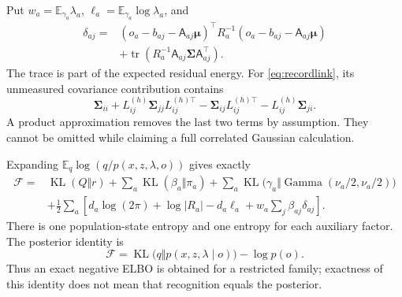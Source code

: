 \documentclass[11pt]{article}
\newcommand{\KL}{\operatorname{KL}}
\newcommand{\Tr}{\operatorname{tr}}
\newcommand{\E}{\mathbb E}
\newcommand{\Ga}{\operatorname{Gamma}}
\newcommand{\m}{\boldsymbol{\mu}}
\newcommand{\Sig}{\boldsymbol{\Sigma}}
\begin{document}
Put $w_a=\E_{\gamma_a}\lambda_a$, $\ell_a=\E_{\gamma_a}\log\lambda_a$, and
\begin{equation}
\begin{split}
\delta_{aj}={}&(o_a-b_{aj}-\mathsf A_{aj}\m)^\top
 R_a^{-1}(o_a-b_{aj}-\mathsf A_{aj}\m)\\
&+\Tr(R_a^{-1}\mathsf A_{aj}\Sig\mathsf A_{aj}^\top).
\end{split}
\label{eq:delta}
\end{equation}
The trace is part of the expected residual energy. For \eqref{eq:recordlink}, its unmeasured covariance contribution contains
\begin{equation}
\Sig_{ii}+L_{ij}^{(h)}\Sig_{jj}L_{ij}^{(h)\top}
-\Sig_{ij}L_{ij}^{(h)\top}-L_{ij}^{(h)}\Sig_{ji}.
\label{eq:crosscov}
\end{equation}
A product approximation removes the last two terms by assumption. They cannot be omitted while claiming a full correlated Gaussian calculation.

Expanding $\E_q\log(q/p(x,z,\lambda,o))$ gives exactly
\begin{align}
\mathcal F={}&\KL(Q\Vert r)+\sum_a\KL(\beta_a\Vert\pi_a)
 +\sum_a\KL\bigl(\gamma_a\Vert\Ga(\nu_a/2,\nu_a/2)\bigr)\nonumber\\
&+\frac12\sum_a\left[d_a\log(2\pi)+\log|R_a|-d_a\ell_a
 +w_a\sum_j\beta_{aj}\delta_{aj}\right].
\label{eq:freeenergy}
\end{align}
There is one population-state entropy and one entropy for each auxiliary factor. The posterior identity is
\begin{equation}
\mathcal F=\KL\bigl(q\Vert p(x,z,\lambda\mid o)\bigr)-\log p(o).
\label{eq:elboidentity}
\end{equation}
Thus an exact negative ELBO is obtained for a restricted family; exactness of this identity does not mean that recognition equals the posterior.
\end{document}
